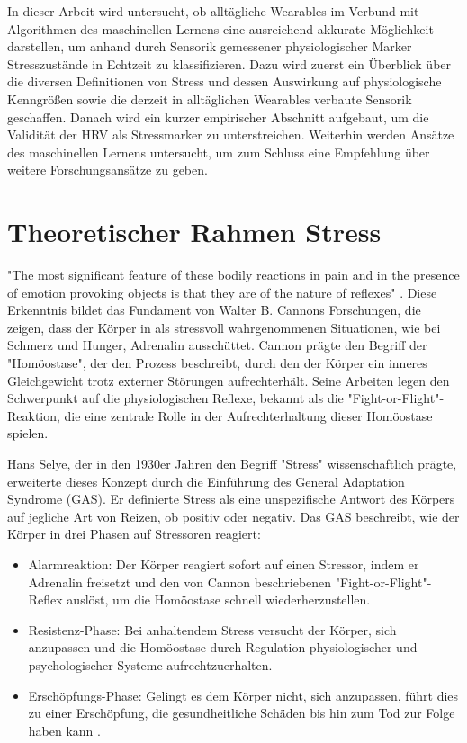 In dieser Arbeit wird untersucht, ob alltägliche Wearables im Verbund mit Algorithmen des maschinellen Lernens eine ausreichend akkurate Möglichkeit darstellen, um anhand durch Sensorik gemessener physiologischer Marker Stresszustände in Echtzeit zu klassifizieren. Dazu wird zuerst ein Überblick über die diversen Definitionen von Stress und dessen Auswirkung auf physiologische Kenngrößen sowie die derzeit in alltäglichen Wearables verbaute Sensorik geschaffen. Danach wird ein kurzer empirischer Abschnitt aufgebaut, um die Validität der \ac{HRV} als Stressmarker zu unterstreichen. Weiterhin werden Ansätze des maschinellen Lernens untersucht, um zum Schluss eine Empfehlung über weitere Forschungsansätze zu geben.

\section{Theoretischer Rahmen Stress}
"The most significant feature of these bodily reactions in pain and in the presence of emotion provoking objects is that they are of the nature of reflexes" \cite{Cannon1915}. Diese Erkenntnis bildet das Fundament von Walter B. Cannons Forschungen, die zeigen, dass der Körper in als stressvoll wahrgenommenen Situationen, wie bei Schmerz und Hunger, Adrenalin ausschüttet. Cannon prägte den Begriff der "Homöostase", der den Prozess beschreibt, durch den der Körper ein inneres Gleichgewicht trotz externer Störungen aufrechterhält. Seine Arbeiten legen den Schwerpunkt auf die physiologischen Reflexe, bekannt als die "Fight-or-Flight"-Reaktion, die eine zentrale Rolle in der Aufrechterhaltung dieser Homöostase spielen.

Hans Selye, der in den 1930er Jahren den Begriff "Stress" wissenschaftlich prägte, erweiterte dieses Konzept durch die Einführung des General Adaptation Syndrome (GAS). Er definierte Stress als eine unspezifische Antwort des Körpers auf jegliche Art von Reizen, ob positiv oder negativ. Das GAS beschreibt, wie der Körper in drei Phasen auf Stressoren reagiert:

\begin{itemize}
    \item Alarmreaktion: Der Körper reagiert sofort auf einen Stressor, indem er Adrenalin freisetzt und den von Cannon beschriebenen "Fight-or-Flight"-Reflex auslöst, um die Homöostase schnell wiederherzustellen.
    \item Resistenz-Phase: Bei anhaltendem Stress versucht der Körper, sich anzupassen und die Homöostase durch Regulation physiologischer und psychologischer Systeme aufrechtzuerhalten.
    \item Erschöpfungs-Phase: Gelingt es dem Körper nicht, sich anzupassen, führt dies zu einer Erschöpfung, die gesundheitliche Schäden bis hin zum Tod zur Folge haben kann \cite{Selye1936}.
\end{itemize}


